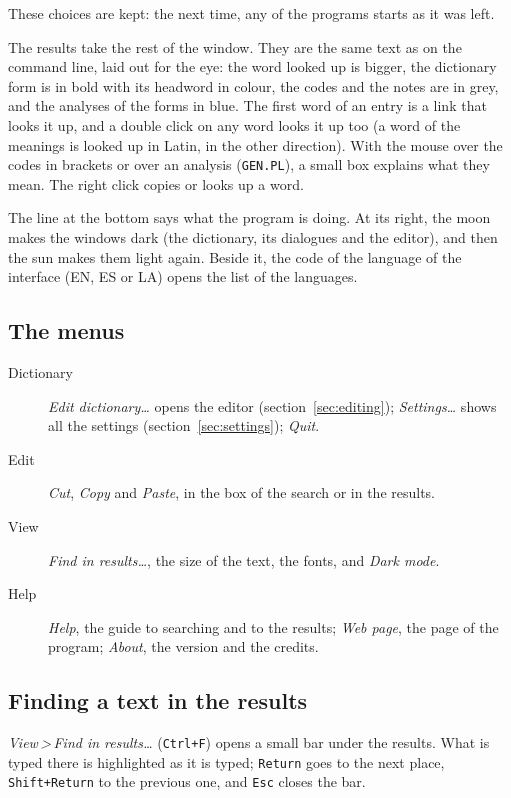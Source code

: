 \documentclass[12pt,
              article,
              oneside
              ]{memoir}
\newcommand*{\menu}[1]{\textit{#1}}
\newcommand*{\then}{\,>\,}
\newcommand*{\key}[1]{\texttt{#1}}
\begin{document}
\noindent
These choices are kept: the next time, any of the programs starts as it
was left.

%
The results take the rest of the window. They are the same text as on the
command line, laid out for the eye: the word looked up is bigger, the
dictionary form is in bold with its headword in colour, the codes and the
notes are in grey, and the analyses of the forms in blue. The first word
of an entry is a link that looks it up, and a double click on any word
looks it up too (a word of the meanings is looked up in Latin, in the
other direction). With the mouse over the codes in brackets or over an
analysis (\texttt{GEN.PL}), a small box explains what they mean. The
right click copies or looks up a word.

%
The line at the bottom says what the program is doing. At its right, the
moon makes the windows dark (the dictionary, its dialogues and the
editor), and then the sun makes them light again. Beside it, the code of
the language of the interface (EN, ES or LA) opens the list of the
languages.

\subsection{The menus}

%
\begin{description}
\item[Dictionary] \menu{Edit dictionary\ldots} opens the editor
  (section~\ref{sec:editing}); \menu{Settings\ldots} shows all the
  settings (section~\ref{sec:settings}); \menu{Quit}.
\item[Edit] \menu{Cut}, \menu{Copy} and \menu{Paste}, in the box of the
  search or in the results.
\item[View] \menu{Find in results\ldots}, the size of the text, the
  fonts, and \menu{Dark mode}.
\item[Help] \menu{Help}, the guide to searching and to the results;
  \menu{Web page}, the page of the program; \menu{About}, the version and
  the credits.
\end{description}

\subsection{Finding a text in the results}

%
\menu{View\then Find in results\ldots} (\key{Ctrl+F}) opens a small bar
under the results. What is typed there is highlighted as it is typed;
\key{Return} goes to the next place, \key{Shift+Return} to the previous
one, and \key{Esc} closes the bar.
\end{document}
